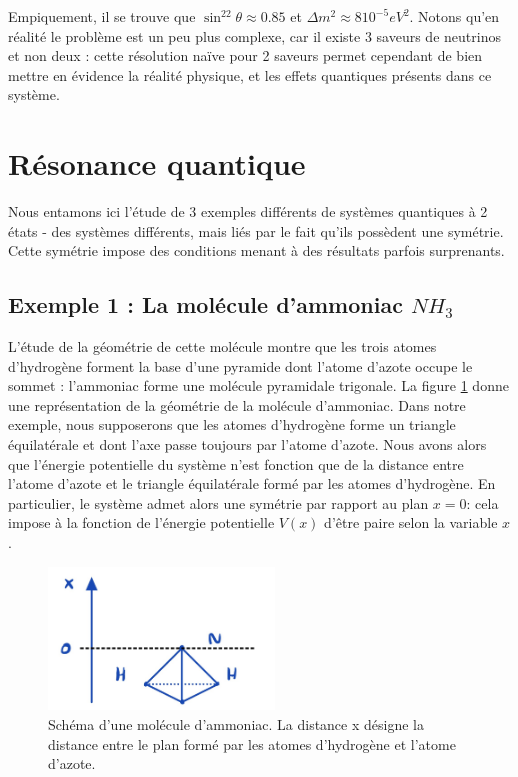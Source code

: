 \documentclass[../notesdecours.tex]{subfiles}
\begin{document}
Empiquement, il se trouve que $\sin^22\theta \approx 0.85$ et $\Delta m^2 \approx 8 10^{-5} eV^2$. \color{purple} Notons qu'en réalité le problème est un peu plus complexe, car il existe 3 saveurs de neutrinos et non deux : cette résolution naïve pour 2 saveurs permet cependant de bien mettre en évidence la réalité physique, et les effets quantiques présents dans ce système. \color{black}

\section{Résonance quantique}

Nous entamons ici l'étude de 3 exemples différents de systèmes quantiques à 2 états - des systèmes différents, mais liés par le fait qu'ils possèdent une symétrie. Cette symétrie impose des conditions menant à des résultats parfois surprenants.

\subsection*{Exemple 1 : La molécule d'ammoniac $NH_3$}

L'étude de la géométrie de cette molécule montre que les trois atomes d'hydrogène forment la base d'une pyramide dont l'atome d'azote occupe le sommet : l'ammoniac forme une molécule pyramidale trigonale. La figure \ref{fig:Schema ammoniac} donne une représentation de la géométrie de la molécule d'ammoniac. Dans notre exemple, nous supposerons que les atomes d'hydrogène forme un triangle équilatérale et dont l'axe passe toujours par l'atome d'azote. Nous avons alors que l'énergie potentielle du système n'est fonction que de la distance entre l'atome d'azote et le triangle équilatérale formé par les atomes d'hydrogène. En particulier, le système admet alors une symétrie par rapport au plan $x = 0$: cela impose à la fonction de l'énergie potentielle $V(x)$ d'être paire selon la variable $x$.\\

\begin{figure}[h]
    \centering
    \includegraphics[width=60mm,scale=0.5]{Chapitre 5/Figure 1.jpg}
    \caption{Schéma d'une molécule d'ammoniac. La distance x désigne la distance entre le plan formé par les atomes d'hydrogène et l'atome d'azote.}
    \label{fig:Schema ammoniac}
\end{figure}
\end{document}
